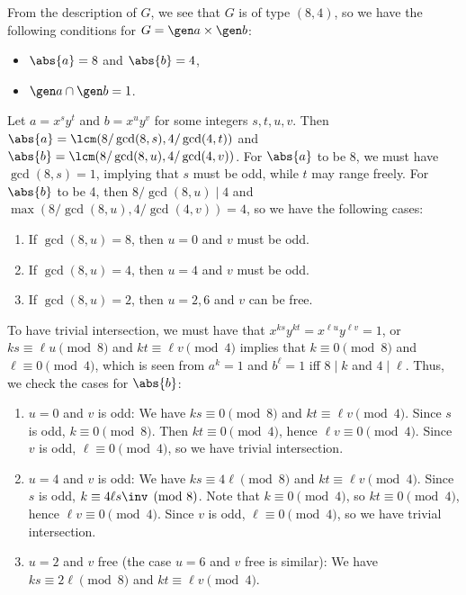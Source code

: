 \begin{solenum}
    \item From the description of $G$, we see that $G$ is of type $(8, 4)$, so we have the following conditions for $G = \gen a \times \gen b$:
    \begin{itemize}
        \item $\abs{a} = 8$ and $\abs{b} = 4$,
        \item $\gen a \cap \gen b = 1$.
    \end{itemize}
    Let $a = x^s y^t$ and $b = x^u y^v$ for some integers $s, t, u, v$.
	Then $\abs{a} = \lcm(8/\gcd(8, s), 4/\gcd(4, t))$ and $\abs{b} = \lcm(8/\gcd(8, u), 4/\gcd(4, v))$.
	For $\abs{a}$ to be 8, we must have $\gcd(8, s) = 1$, implying that $s$ must be odd, while $t$ may range freely.
	For $\abs{b}$ to be 4, then $8/\gcd(8, u) \mid 4$ and $\max(8/\gcd(8, u), 4/\gcd(4, v)) = 4$, so we have the following cases:
    \begin{enumerate}[label=(\arabic*)]
        \item If $\gcd(8, u) = 8$, then $u = 0$ and $v$ must be odd.
        \item If $\gcd(8, u) = 4$, then $u = 4$ and $v$ must be odd.
        \item If $\gcd(8, u) = 2$, then $u = 2, 6$ and $v$ can be free.
    \end{enumerate}
    To have trivial intersection, we must have that $x^{ks} y^{kt} = x^{\ell u} y^{\ell v} = 1$, or $ks \equiv \ell u \pmod 8$ and $kt \equiv \ell v \pmod 4$ implies that $k \equiv 0 \pmod 8$ and $\ell \equiv 0 \pmod 4$, which is seen from $a^k = 1$ and $b^\ell = 1$ iff $8 \mid k$ and $4 \mid \ell$.
	Thus, we check the cases for $\abs{b}$:
    \begin{enumerate}[label=(\arabic*)]
        \item $u = 0$ and $v$ is odd: We have $ks \equiv 0 \pmod 8$ and $kt \equiv \ell v \pmod 4$.
	Since $s$ is odd, $k \equiv 0 \pmod 8$.
	Then $kt \equiv 0 \pmod 4$, hence $\ell v \equiv 0 \pmod 4$.
	Since $v$ is odd, $\ell \equiv 0 \pmod 4$, so we have trivial intersection.
        \item $u = 4$ and $v$ is odd: We have $ks \equiv 4\ell \pmod 8$ and $kt \equiv \ell v \pmod 4$.
	Since $s$ is odd, $k \equiv 4\ell s\inv \pmod 8$.
	Note that $k \equiv 0 \pmod 4$, so $kt \equiv 0 \pmod 4$, hence $\ell v \equiv 0 \pmod 4$.
	Since $v$ is odd, $\ell \equiv 0 \pmod 4$, so we have trivial intersection.
        \item $u = 2$ and $v$ free (the case $u = 6$ and $v$ free is similar): We have $ks \equiv 2\ell \pmod 8$ and $kt \equiv \ell v \pmod 4$.

\end{enumerate}
\end{solenum}
